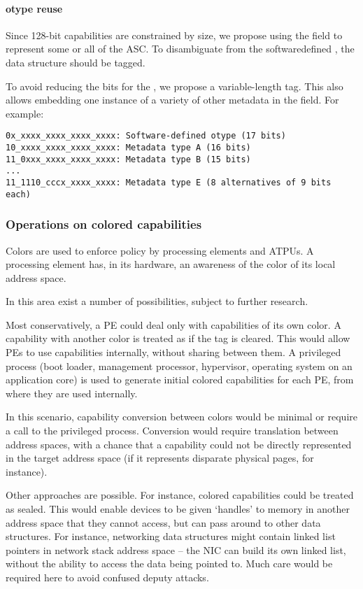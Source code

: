 \paragraph{otype reuse}
\label{app:exp:otype-reuse}
Since 128-bit capabilities are constrained by size, we propose using the \cotype{} field to represent some or all of the ASC.  To disambiguate from the softwaredefined \cotype{}, the data structure should be tagged.

To avoid reducing the bits for the \cotype{}, we propose a variable-length tag.  This also allows embedding one instance of a variety of other metadata in the \cotype{} field.  For example:

\begin{verbatim}
0x_xxxx_xxxx_xxxx_xxxx: Software-defined otype (17 bits)
10_xxxx_xxxx_xxxx_xxxx: Metadata type A (16 bits)
11_0xxx_xxxx_xxxx_xxxx: Metadata type B (15 bits)
...
11_1110_cccx_xxxx_xxxx: Metadata type E (8 alternatives of 9 bits each)
\end{verbatim}


\subsubsection{Operations on colored capabilities}
Colors are used to enforce policy by processing elements and ATPUs.  A processing element has, in its hardware, an awareness of the color of its local address space.

In this area exist a number of possibilities, subject to further research.

Most conservatively, a PE could deal only with capabilities of its own color.  A capability with another color is treated as if the tag is cleared.  This would allow PEs to use capabilities internally, without sharing between them.  A privileged process (boot loader, management processor, hypervisor, operating system on an application core) is used to generate initial colored capabilities for each PE, from where they are used internally.

In this scenario, capability conversion between colors would be minimal or require a call to the privileged process.
Conversion would require translation between address spaces, with a chance that a capability could not be directly represented in the target address space (if it represents disparate physical pages, for instance).

Other approaches are possible.  For instance, colored capabilities could be treated as sealed.  This would enable devices to be given `handles' to memory in another address space that they cannot access, but can pass around to other data structures.  For instance, networking data structures might contain linked list pointers in network stack address space -- the NIC can build its own linked list, without the ability to access the data being pointed to.  Much care would be required here to avoid confused deputy attacks.

